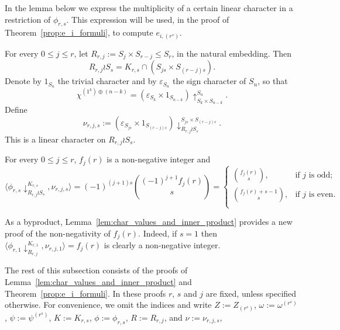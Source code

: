 \documentclass[ALCO,published]{cedram}
\begin{document}
In the lemma below we express the multiplicity of a certain linear character in a restriction of $\phi_{r,s}$.
This expression will be used, in the proof of Theorem~\ref{prop:e_i_formuli}, to compute $e_{i,(r^s)}$.
	
For every $0\leq j\leq r$, let 
$R_{r,j} := S_j \times S_{r-j} \le S_r$, in the natural embedding. Then
\[
    R_{r,j} \wr S_s
    = K_{r,s} \cap \left( S_{js} \times S_{(r-j)s} \right).
\]
Denote by $1_{S_n}$ the trivial character and by $\varepsilon_{S_n}$ the sign character of $S_n$, so that
\[
    \chi^{(1^k)\oplus(n-k)}=(\varepsilon_{S_{k}}\times 1_{S_{n-k}})\uparrow_{S_k \times S_{n-k}}^{S_n}.
\]
Define
\[
    \nu_{r,j,s} := (\varepsilon_{S_{js}} \times 1_{S_{(r-j)s}}) \downarrow_{R_{r,j}\wr S_s}^{S_{js} \times S_{(r-j)s}}.
\]
This is a linear character on $R_{r,j} \wr S_s$.
	
\begin{lemma}\label{lem:char_values_and_inner_product}
    For every $0\le j\le r$,
    $f_j(r)$ is a non-negative integer and 
    \[
        \langle \phi_{r,s}\downarrow_{R_{r,j}\wr S_{s}}^{K_{r,s}},\nu_{r,j,s} \rangle 
        = (-1)^{(j+1)s} \binom{(-1)^{j+1} f_j(r)}{s}
        = \begin{cases}
            \binom{f_j(r)}{s}, &\text{if } j \text{ is odd;}\\
            \binom{f_j(r)+s-1}{s}, &\text{if } j \text{ is even.}\\
        \end{cases}
    \]
\end{lemma}
		
\begin{remark}
    As a byproduct, Lemma~\ref{lem:char_values_and_inner_product}
    provides a new proof of the non-negativity of $f_j(r)$.
    Indeed, if $s=1$ then 
    $\langle \phi_{r,1} \downarrow_{R_{r,j}}^{K_{r,1}},\nu_{r,j,1} \rangle = f_j(r)$ 
    is clearly a non-negative integer.
\end{remark}	
	
The rest of this subsection consists of the proofs of Lemma~\ref{lem:char_values_and_inner_product} 
and Theorem~\ref{prop:e_i_formuli}. 
In these proofs 
$r$, $s$ and $j$ are fixed, unless specified otherwise. 
For convenience, we omit the indices and write 
$Z := Z_{(r^s)}$, 
$\omega := \omega^{(r^s)}$, 
$\psi := \psi^{(r^s)}$, 
$K := K_{r,s}$, 
$\phi := \phi_{r,s}$, 
$R := R_{r,j}$, and
$\nu := \nu_{r,j,s}$, 
\end{document}

